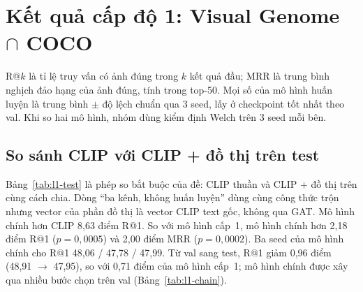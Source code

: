 \section{Kết quả cấp độ 1: Visual Genome $\cap$ COCO}
\label{sec:l1}

R@$k$ là tỉ lệ truy vấn có ảnh đúng trong $k$ kết quả đầu; MRR là trung bình nghịch đảo hạng của ảnh đúng, tính trong
top-50. Mọi số của mô hình huấn luyện là trung bình $\pm$ độ lệch chuẩn qua 3 seed, lấy ở checkpoint tốt nhất theo val.
Khi so hai mô hình, nhóm dùng kiểm định Welch trên 3 seed mỗi bên.

\subsection{So sánh CLIP với CLIP + đồ thị trên test}

\begin{table}[t]
\centering
\caption{Kết quả trên test VG $\cap$ COCO (10\,696 truy vấn, pool 2\,138 ảnh). Test chấm một lần cho mỗi mô hình đã chốt.}
\label{tab:l1-test}
\footnotesize
\setlength{\tabcolsep}{3pt}
\end{table}

Bảng~\ref{tab:l1-test} là phép so bắt buộc của đề: CLIP thuần và CLIP + đồ thị trên cùng cách chia. Dòng ``ba kênh, không
huấn luyện'' dùng cùng công thức trộn nhưng vector của phần đồ thị là vector CLIP text gốc, không qua GAT. Mô hình chính hơn
CLIP 8,63 điểm R@1. So với mô hình cấp~1, mô hình chính hơn 2,18 điểm R@1 ($p = 0{,}0005$) và 2,00 điểm MRR
($p = 0{,}0002$). Ba seed của mô hình chính cho R@1 48,06 / 47,78 / 47,99. Từ val sang test, R@1 giảm 0,96 điểm (48,91
$\to$ 47,95), so với 0,71 điểm của mô hình cấp~1; mô hình chính được xây qua nhiều bước chọn trên val
(Bảng~\ref{tab:l1-chain}).

